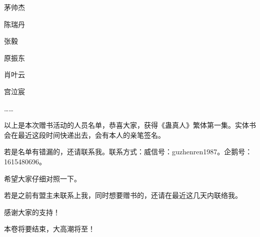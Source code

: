 \begin{this_body}
茅帅杰

陈瑞丹

张毅

原振东

肖叶云

宫泣宸

……

以上是本次赠书活动的人员名单，恭喜大家，获得《蛊真人》繁体第一集。实体书会在最近这段时间快递出去，会有本人的亲笔签名。

若是名单有错漏的，还请联系我。联系方式：威信号：guzhenren1987。企鹅号：1615480696。

希望大家仔细对照一下。

若是之前有盟主未联系上我，同时想要赠书的，还请在最近这几天内联络我。

感谢大家的支持！

本卷将要结束，大高潮将至！

\end{this_body}

